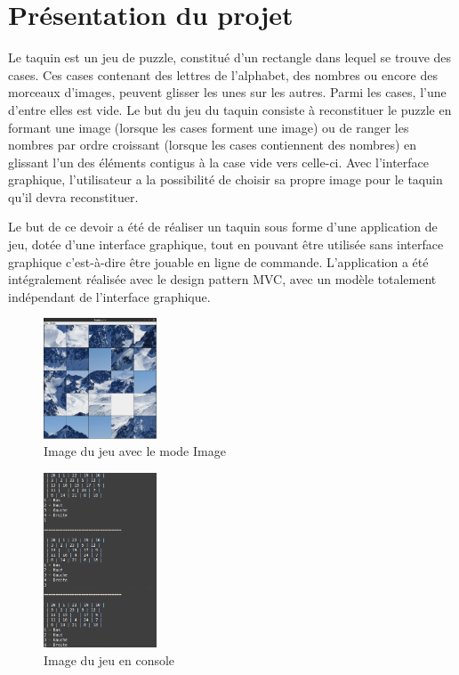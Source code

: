 \chapter{Présentation du projet}

		Le taquin est un jeu de puzzle, constitué d’un rectangle dans lequel se trouve des cases. Ces cases contenant des lettres de l'alphabet,
		des nombres ou encore des morceaux d’images, peuvent glisser les unes sur les autres. Parmi les cases, l’une d'entre elles est vide.
		Le but du jeu du taquin consiste à reconstituer le puzzle en formant une image (lorsque les cases forment une image) ou de ranger les nombres par ordre croissant (lorsque les cases contiennent des nombres) en glissant l'un des éléments contigus à la case vide vers celle-ci. Avec l’interface graphique, l'utilisateur a la possibilité de choisir sa propre image pour le taquin qu’il devra reconstituer.

		Le but de ce devoir a été de réaliser un taquin sous forme d’une application de jeu, dotée d'une interface graphique, tout en pouvant être utilisée sans interface graphique c'est-à-dire être jouable en ligne de commande. L'application a été intégralement réalisée avec le design pattern MVC, avec un modèle totalement indépendant de l'interface graphique.

		\begin{figure}[H]
			\centering\includegraphics[width=0.30\textwidth, keepaspectratio]{img/jeuImage.png}
			\caption{Image du jeu avec le mode Image}
			\label{fig:JeuImage}
		\end{figure}

		\begin{figure}[H]
			\centering\includegraphics[width=0.30\textwidth, keepaspectratio]{img/jeuConsole.png}
			\caption{Image du jeu en console}
			\label{fig:JeuConsole}
		\end{figure}
